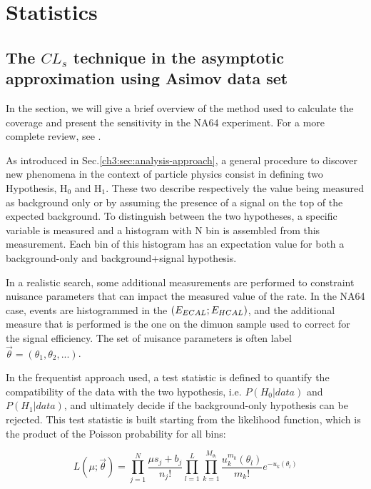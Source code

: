 
\chapter{Statistics} %

\label{AppendixE} %

\section{The $CL_s$ technique in the asymptotic approximation using Asimov data set}

In the section, we will give a brief overview of the method used to calculate the coverage and present the sensitivity in the NA64 experiment. For a more complete review, see \cite{Read_2002,JUNK1999435,Cowan:2010js}.

As introduced in Sec.\ref{ch3:sec:analysis-approach}, a general procedure to discover new phenomena in the context of particle physics consist in defining two Hypothesis, H$_0$ and H$_1$. These two describe respectively the value being measured as background only or by assuming the presence of a signal on the top of the expected background.  To distinguish between the two hypotheses, a specific variable is measured and a histogram with N bin is assembled from this measurement. Each bin of this histogram has an expectation value for both a background-only and background+signal hypothesis.

In a realistic search, some additional measurements are performed to constraint nuisance parameters that can impact the measured value of the rate. In the NA64 case, events are histogrammed in the $(E_{ECAL};E_{HCAL})$, and the additional measure that is performed is the one on the dimuon sample used to correct for the signal efficiency. The set of nuisance parameters is often label $\vec{\theta} = (\theta_1, \theta_2, ...)$.

In the frequentist approach used, a test statistic is defined to quantify the compatibility of the data with the two hypothesis, i.e. $P(H_0 | data)$ and $P(H_1 | data)$, and ultimately decide if the background-only hypothesis can be rejected. This test statistic is built starting from the likelihood function, which is the product of the Poisson probability for all bins:

\begin{equation}
  \label{eq:likelihood}
  L(\mu; \vec{\theta}) = \prod_{j=1}^N \frac{\mu s_j + b_j}{n_j!} \prod_{l=1}^{L}\prod_{k=1}^{M_{\theta_l}}\frac{u^{m_k}_k(\theta_l)}{m_k!} e^{-u_k(\theta_l)}
\end{equation}

